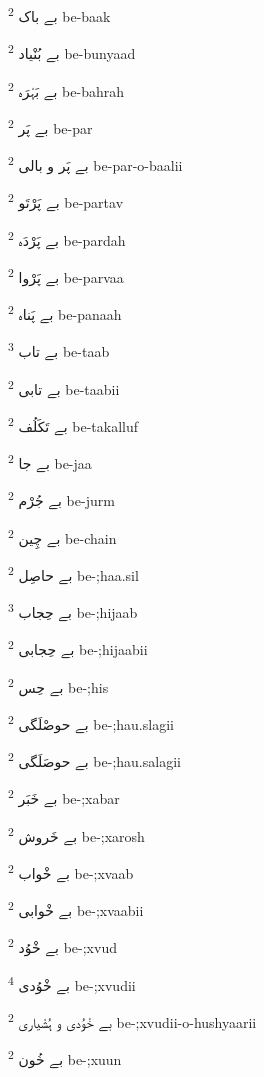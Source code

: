 \documentclass[12pt]{article}
\begin{document}
\begin{multicols}{5}
{\ur بے باک}   \textsuperscript{2} be-baak

{\ur بے بُنْیاد}   \textsuperscript{2} be-bunyaad

{\ur بے بَہْرَہ}   \textsuperscript{2} be-bahrah

{\ur بے پَر}   \textsuperscript{2} be-par

{\ur بے پَر و بالی}   \textsuperscript{2} be-par-o-baalii

{\ur بے پَرْتَو}   \textsuperscript{2} be-partav

{\ur بے پَرْدَہ}   \textsuperscript{2} be-pardah

{\ur بے پَرْوا}   \textsuperscript{2} be-parvaa

{\ur بے پَناہ}   \textsuperscript{2} be-panaah

{\ur بے تاب}   \textsuperscript{3} be-taab

{\ur بے تابی}   \textsuperscript{2} be-taabii

{\ur بے تَکَلُف}   \textsuperscript{2} be-takalluf

{\ur بے جا}   \textsuperscript{2} be-jaa

{\ur بے جُرْم}   \textsuperscript{2} be-jurm

{\ur بے چِین}   \textsuperscript{2} be-chain

{\ur بے حاصِل}   \textsuperscript{2} be-;haa.sil

{\ur بے حِجاب}   \textsuperscript{3} be-;hijaab

{\ur بے حِجابی}   \textsuperscript{2} be-;hijaabii

{\ur بے حِس}   \textsuperscript{2} be-;his

{\ur بے حوصْلَگی}   \textsuperscript{2} be-;hau.slagii

{\ur بے حوصَلَگی}   \textsuperscript{2} be-;hau.salagii

{\ur بے خَبَر}   \textsuperscript{2} be-;xabar

{\ur بے خَروش}   \textsuperscript{2} be-;xarosh

{\ur بے خْواب}   \textsuperscript{2} be-;xvaab

{\ur بے خْوابی}   \textsuperscript{2} be-;xvaabii

{\ur بے خْوُد}   \textsuperscript{2} be-;xvud

{\ur بے خْوُدی}   \textsuperscript{4} be-;xvudii

{\ur بے خْوُدی و ہُشْیاری}   \textsuperscript{2} be-;xvudii-o-hushyaarii

{\ur بے خُون}   \textsuperscript{2} be-;xuun


\end{multicols}
\end{document}
